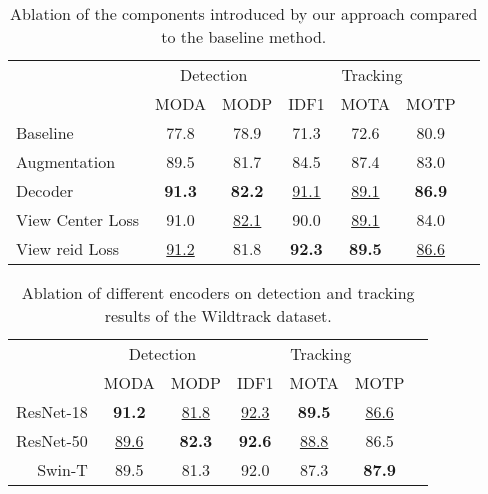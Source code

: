 \documentclass[10pt,twocolumn,letterpaper]{article}
\begin{document}
{\begin{table}[t]
\setlength{\tabcolsep}{2.75pt}
\centering
\begin{tabular}{lcccccc}
\toprule
& \multicolumn{2}{c}{Detection} & \multicolumn{3}{c}{Tracking} \\\cmidrule(lr){2-3}\cmidrule(lr){4-6}
& MODA & MODP & IDF1 & MOTA & MOTP  \\
\midrule
\small{Baseline} &  77.8 & 78.9 & 71.3 & 72.6 & 80.9\\  \midrule
 \small{Augmentation}         & 89.5 & 81.7 & 84.5 & 87.4 & 83.0\\
 \small{Decoder}              & \textbf{91.3} & \textbf{82.2} & \underline{91.1} & \underline{89.1} & \textbf{86.9}\\
 \small{View Center Loss}     & 91.0 & \underline{82.1} & 90.0 & \underline{89.1} & 84.0\\
 \small{View \gls{reid} Loss} &\underline{91.2} & 81.8 & \textbf{92.3} & \textbf{89.5} & \underline{86.6}\\
\bottomrule
\end{tabular}
\caption{Ablation of the components introduced by our approach compared to the baseline method.}
\label{tab:model-ablation}
\end{table}
 \begin{table}[t!]
\setlength{\tabcolsep}{2.75pt}
\centering
\begin{tabular}{rcccccc}
\toprule
& \multicolumn{2}{c}{Detection} & \multicolumn{3}{c}{Tracking} \\\cmidrule(lr){2-3}\cmidrule(lr){4-6}
& MODA & MODP & IDF1 & MOTA & MOTP  \\
\midrule
ResNet-18 & \textbf{91.2} & \underline{81.8} & \underline{92.3} & \textbf{89.5} & \underline{86.6} \\
ResNet-50 & \underline{89.6} & \textbf{82.3} & \textbf{92.6} & \underline{88.8} & 86.5 \\
Swin-T   & 89.5 & 81.3 & 92.0 & 87.3 & \textbf{87.9} \\
\bottomrule
\end{tabular}
\caption{Ablation of different encoders on detection and tracking results of the Wildtrack dataset.}
\label{tab:backbone-ablation}
\end{table}
 
}
\end{document}
